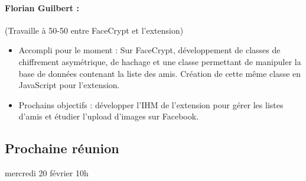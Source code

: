 \documentclass[a4paper,10pt]{article}
\begin{document}
\paragraph{Florian Guilbert : } (Travaille à 50-50 entre FaceCrypt et l'extension)
\begin{itemize}
    \item Accompli pour le moment : Sur FaceCrypt, développement de classes 
        de chiffrement asymétrique, de hachage et une classe permettant de 
        manipuler la base de données contenant la liste des amis. Création de
        cette même classe en JavaScript pour l'extension. 
\item Prochains objectifs : développer l'IHM de l'extension pour gérer les 
        listes d'amis et étudier l'upload d'images sur Facebook.
\end{itemize}

\subsection*{Prochaine réunion}
    mercredi 20 février 10h
    
\end{document}
